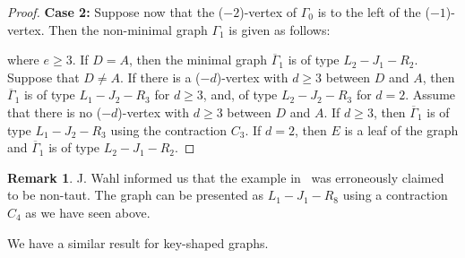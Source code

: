 \documentclass[a4paper, reqno, twoside]{amsart}
\theoremstyle{definition}
\newtheorem{remark}[theorem]{Remark}
\numberwithin{equation}{section}
\begin{document}
\begin{proof}
\textbf{Case 2:} Suppose now that the ($-2$)-vertex of $\Gamma_0$ is
to the left of the ($-1$)-vertex. Then the non-minimal graph
$\Gamma_1$ is given as follows:
\begin{center}
\end{center}
where $e \ge 3$. If $D=A$, then the minimal graph
$\overline{\Gamma}_1$ is of type $L_2-J_1-R_2$. Suppose that $D \neq
A$. If there is a ($-d$)-vertex with $d \ge 3$ between $D$ and $A$,
then $\overline{\Gamma}_1$ is of type $L_1-J_2-R_3$ for $d \ge 3$,
and, of type $L_2-J_2-R_3$ for $d=2$. Assume that there is no
($-d$)-vertex with $d \ge 3$ between $D$ and $A$. If $d \ge 3$, then
$\overline{\Gamma}_1$ is of type $L_1-J_2-R_3$ using the contraction
$C_3$. If $d=2$, then $E$ is a leaf of the graph and
$\overline{\Gamma}_1$ is of type $L_2-J_1-R_2$.
\end{proof}

\begin{remark}
J. Wahl informed us that
the example in~\cite[Remark~8.9]{Wahl-2011} was erroneously
claimed to be non-taut. The graph can be presented as $L_1-J_1-R_8$ using a contraction $C_4$ as we have seen above.
\end{remark}

We have a similar result for key-shaped graphs.
\end{document}
